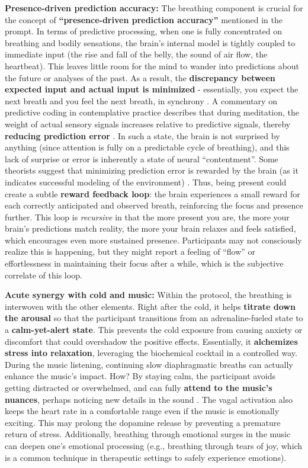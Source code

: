\documentclass[11pt]{article}
\newcommand{\quotes}[1]{``#1''}
\begin{document}
\textbf{Presence-driven prediction accuracy:} The breathing component is crucial for the concept of \textbf{\quotes{presence-driven prediction accuracy}} mentioned in the prompt. In terms of predictive processing, when one is fully concentrated on breathing and bodily sensations, the brain's internal model is tightly coupled to immediate input (the rise and fall of the belly, the sound of air flow, the heartbeat). This leaves little room for the mind to wander into predictions about the future or analyses of the past. As a result, the \textbf{discrepancy between expected input and actual input is minimized} - essentially, you expect the next breath and you feel the next breath, in synchrony \cite{PretictiveMind}. A commentary on predictive coding in contemplative practice describes that during meditation, the weight of actual sensory signals increases relative to predictive signals, thereby \textbf{reducing prediction error} \cite{PretictiveMind}. In such a state, the brain is not surprised by anything (since attention is fully on a predictable cycle of breathing), and this lack of surprise or error is inherently a state of neural \quotes{contentment}. Some theorists suggest that minimizing prediction error is rewarded by the brain (as it indicates successful modeling of the environment) \cite{PretictiveMind}. Thus, being present could create a subtle \textbf{reward feedback loop}: the brain experiences a small reward for each correctly anticipated and observed breath, reinforcing the focus and presence further. This loop is \textit{recursive} in that the more present you are, the more your brain's predictions match reality, the more your brain relaxes and feels satisfied, which encourages even more sustained presence. Participants may not consciously realize this is happening, but they might report a feeling of \quotes{flow} or effortlessness in maintaining their focus after a while, which is the subjective correlate of this loop.

\textbf{Acute synergy with cold and music:} Within the protocol, the breathing is interwoven with the other elements. Right after the cold, it helps \textbf{titrate down the arousal} so that the participant transitions from an adrenaline-fueled state to a \textbf{calm-yet-alert state}. This prevents the cold exposure from causing anxiety or discomfort that could overshadow the positive effects. Essentially, it \textbf{alchemizes stress into relaxation}, leveraging the biochemical cocktail in a controlled way. During the music listening, continuing slow diaphragmatic breaths can actually enhance the music's impact. How? By staying calm, the participant avoids getting distracted or overwhelmed, and can fully \textbf{attend to the music's nuances}, perhaps noticing new details in the sound \cite{benjamin}. The vagal activation also keeps the heart rate in a comfortable range even if the music is emotionally exciting. This may prolong the dopamine release by preventing a premature return of stress. Additionally, breathing through emotional surges in the music can deepen one's emotional processing (e.g., breathing through tears of joy, which is a common technique in therapeutic settings to safely experience emotions).
\end{document}
